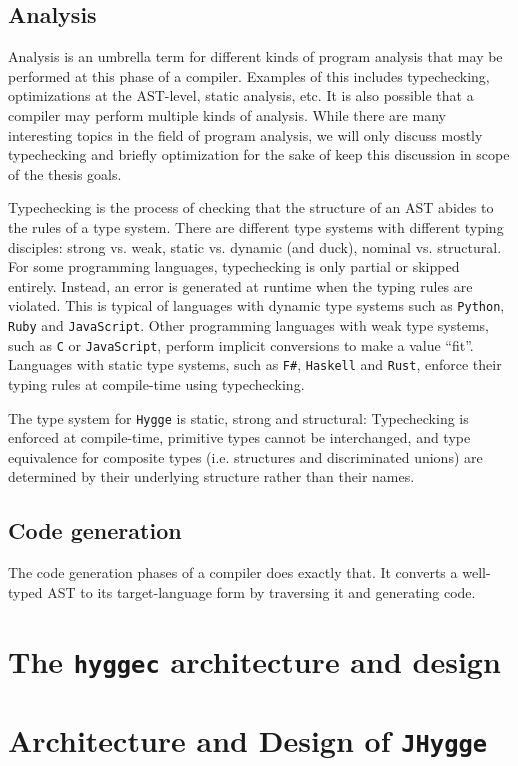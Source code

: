 \subsection{Analysis}

Analysis is an umbrella term for different kinds of program analysis that may be performed at this phase of a compiler. Examples of this includes typechecking, optimizations at the AST-level,
static analysis, etc. It is also possible that a compiler may perform multiple kinds of analysis. While there are many interesting topics in the field of program analysis,
we will only discuss mostly typechecking and briefly optimization for the sake of keep this discussion in scope of the thesis goals.

Typechecking is the process of checking that the structure of an AST abides to the rules of a type system. There are different type systems with different typing disciples:
strong vs. weak, static vs. dynamic (and duck), nominal vs. structural. For some programming languages, typechecking is only partial or skipped entirely. Instead,
an error is generated at runtime when the typing rules are violated. This is typical of languages with dynamic type systems such as \texttt{Python}, \texttt{Ruby} and
\texttt{JavaScript}. Other programming languages with weak type systems, such as \texttt{C} or \texttt{JavaScript}, perform implicit conversions to make a value ``fit''.
Languages with static type systems, such as \texttt{F\#}, \texttt{Haskell} and \texttt{Rust}, enforce their typing rules at compile-time using typechecking.

The type system for \texttt{Hygge} is static, strong and structural: Typechecking is enforced at compile-time, primitive types cannot be interchanged, and type
equivalence for composite types (i.e. structures and discriminated unions) are determined by their underlying structure rather than their names. 

\subsection{Code generation}

The code generation phases of a compiler does exactly that. It converts a well-typed AST to its target-language form by traversing it and generating code.

\section{The \texttt{hyggec} architecture and design}

\section{Architecture and Design of \texttt{JHygge}}

